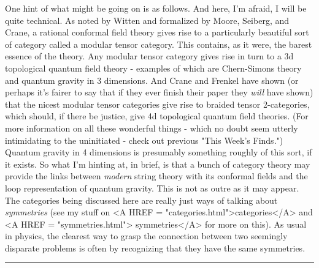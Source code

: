One hint of what might be going on is as follows.
And here, I'm afraid, I will be quite technical.  As noted by Witten and
formalized by Moore, Seiberg, and Crane, a rational conformal field
theory gives rise to a particularly beautiful sort of category called a
modular tensor category.  This contains, as it were, the barest essence
of the theory.  Any modular tensor category gives rise in turn to a 3d
topological quantum field theory - examples of which are Chern-Simons
theory and quantum gravity in 3 dimensions.  And Crane and Frenkel have
shown (or perhaps it's fairer to say that if they ever finish their
paper they \emph{will} have shown) that the nicest modular tensor categories
give rise to braided tensor 2-categories, which should, if there be
justice, give 4d topological quantum field theories.  (For more
information on all these wonderful things - which no doubt seem utterly
intimidating to the uninitiated - check out previous "This Week's
Finds.")  Quantum gravity in 4 dimensions is presumably something
roughly of this sort, if it exists.  So what I'm hinting at, in brief,
is that a bunch of category theory may provide the links between
\emph{modern} string theory with its conformal fields and the loop
representation of quantum gravity.  This is not as outre as it may
appear.  The categories being discussed here are really just ways of
talking about \emph{symmetries} (see my stuff on <A HREF = 
"categories.html">categories</A> and <A HREF = "symmetries.html">
symmetries</A> for more on this).  As usual in physics, the clearest 
way to grasp the connection between two seemingly disparate problems is 
often by recognizing that they have the same symmetries.
\par\noindent\rule{\textwidth}{0.4pt}

